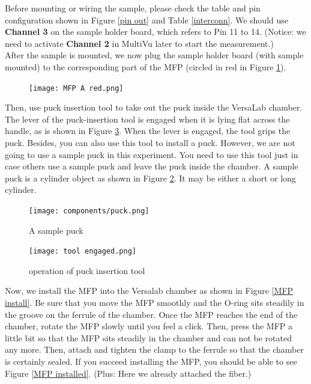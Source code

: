 \documentclass{article}
\begin{document}
            Before mounting or wiring the sample, please check the table and pin configuration shown in Figure \ref{pin out} and Table \ref{interconn}. We should use \textbf{Channel 3} on the sample holder board, which refers to Pin 11 to 14. (Notice: we need to activate \textbf{Channel 2} in MultiVu later to start the measurement.)\\
            
            After the sample is mounted, we now plug the sample holder board (with sample mounted) to the corresponding part of the MFP (circled in red in Figure \ref{MFP a red}).

            \begin{figure}[H]
                \centering
                \texttt{[image: MFP A red.png]}
                \label{MFP a red}
            \end{figure}

            Then, use puck insertion tool to take out the puck inside the VersaLab chamber. The lever of the puck-insertion tool is engaged when it is lying flat across the handle, as is shown in Figure \ref{tool engaged}. When the lever is engaged, the tool grips the puck. Besides, you can also use this tool to install a puck. However, we are not going to use a sample puck in this experiment. You need to use this tool just in case others use a sample puck and leave the puck inside the chamber. A sample puck is a cylinder object as shown in Figure \ref{puck}. It may be either a short or long cylinder.

            \begin{figure}[H]
                \centering
                \texttt{[image: components/puck.png]}
                \caption{A sample puck}
                \label{puck}
            \end{figure}

            \begin{figure}[H]
                \centering
                \texttt{[image: tool engaged.png]}
                \caption{operation of puck insertion tool}
                \label{tool engaged}
            \end{figure}
            
            Now, we install the MFP into the Versalab chamber as shown in Figure \ref{MFP install}. Be sure that you move the MFP smoothly and the O-ring sits steadily in the groove on the ferrule of the chamber. Once the MFP reaches the end of the chamber, rotate the MFP slowly until you feel a click. Then, press the MFP a little bit so that the MFP sits steadily in the chamber and can not be rotated any more. Then, attach and tighten the clamp to the ferrule so that the chamber is certainly sealed. If you succeed installing the MFP, you should be able to see Figure \ref{MFP installed}. (Plus: Here we already attached the fiber.)
            
\end{document}

